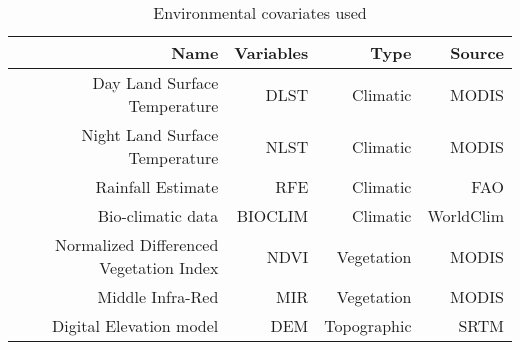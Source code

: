 \begin{table}[ht]
\centering
\caption{Environmental covariates used} 
\label{tab:envir}
\begin{tabular}{rrrr}
  \hline
Name &  Variables & Type & Source  \\ 
  \hline
Day Land Surface Temperature & DLST & Climatic & MODIS \\
Night Land Surface Temperature & NLST & Climatic & MODIS \\
Rainfall Estimate & RFE & Climatic & FAO \\
Bio-climatic data & BIOCLIM & Climatic & WorldClim \\ 
Normalized Differenced Vegetation Index & NDVI & Vegetation & MODIS \\
Middle Infra-Red & MIR & Vegetation & MODIS \\
Digital Elevation model &  DEM & Topographic & SRTM \\
   \hline
\end{tabular}
\end{table}

